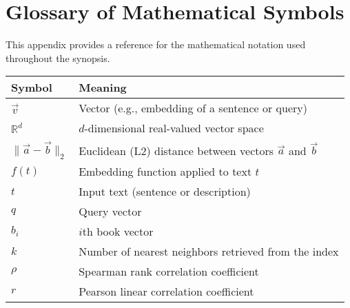 \chapter{Glossary of Mathematical Symbols}
\label{appendix:symbols}

This appendix provides a reference for the mathematical notation used throughout the synopsis.

\begin{longtable}{p{2cm}p{11cm}}
\toprule
\textbf{Symbol} & \textbf{Meaning} \\
\midrule
$\vec{v}$ & Vector (e.g., embedding of a sentence or query) \\
$\mathbb{R}^d$ & $d$-dimensional real-valued vector space \\
$\|\vec{a} - \vec{b}\|_2$ & Euclidean (L2) distance between vectors $\vec{a}$ and $\vec{b}$ \\
$f(t)$ & Embedding function applied to text $t$ \\
$t$ & Input text (sentence or description) \\
$q$ & Query vector \\
$b_i$ & $i$th book vector \\
$k$ & Number of nearest neighbors retrieved from the index \\
$\rho$ & Spearman rank correlation coefficient \\
$r$ & Pearson linear correlation coefficient \\
\bottomrule
\end{longtable}